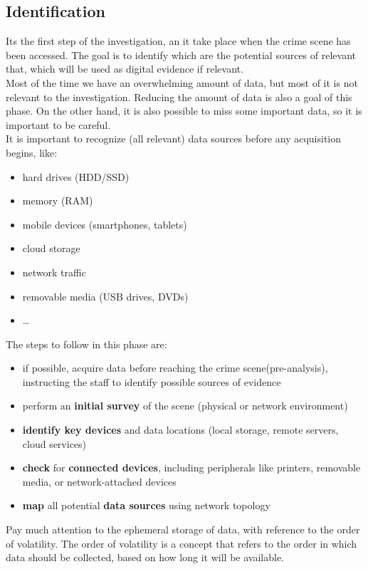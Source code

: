\subsection{Identification}
Its the first step of the investigation, an it take place when the
crime scene has been accessed. The goal is to identify which are the
potential sources of relevant that, which will be used as digital
evidence if relevant.\\
Most of the time we have an overwhelming amount of data, but most of
it is not relevant to the investigation. Reducing the amount of data 
is also a goal of this phase. On the other hand, it is also possible
to miss some important data, so it is important to be careful.\\
It is important to recognize (all relevant) data sources before any
acquisition begins, like:
\begin{itemize}
  \item hard drives (HDD/SSD)
  \item memory (RAM)
  \item mobile devices (smartphones, tablets)
  \item cloud storage
  \item network traffic
  \item removable media (USB drives, DVDs)
  \item \dots 
\end{itemize}
The steps to follow in this phase are:
\begin{itemize}
  \item if possible, acquire data before reaching the crime
    scene(pre-analysis), instructing the staff to identify possible
    sources of evidence
  \item perform an \textbf{initial survey} of the scene (physical or
    network environment)
  \item \textbf{identify key devices} and data locations (local
    storage, remote servers, cloud services)
  \item \textbf{check} for \textbf{connected devices}, including
    peripherals like printers, removable media, or network-attached
    devices
  \item \textbf{map} all potential \textbf{data sources} using network
    topology
\end{itemize}
Pay much attention to the ephemeral storage of data, with reference to
the order of volatility. The order of volatility is a concept that
refers to the order in which data should be collected, based on how 
long it will be available.
